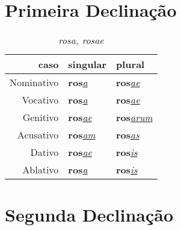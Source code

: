 \documentclass{article}
\newcommand{\radicaldesinencia}[2]{\textbf{#1}\textit{\underline{#2}}}
\begin{document}

\section*{Primeira Declinação}

\begin{table}[H]
\centering
\caption*{\textit{rosa, rosae}}
\vspace{0.2cm}
\begin{tabular}{r|l|l}
\hline
caso			&	singular					& plural 						\\
\hline                                    		
\hline
Nominativo	&	\radicaldesinencia{ros}{a}	& \radicaldesinencia{ros}{ae}	\\
Vocativo		&	\radicaldesinencia{ros}{a}	& \radicaldesinencia{ros}{ae}	\\
Genitivo		&	\radicaldesinencia{ros}{ae}	& \radicaldesinencia{ros}{arum}	\\
Acusativo	&	\radicaldesinencia{ros}{am}	& \radicaldesinencia{ros}{as}	\\
Dativo		&	\radicaldesinencia{ros}{ae}	& \radicaldesinencia{ros}{is}		\\
Ablativo		&	\radicaldesinencia{ros}{a}	& \radicaldesinencia{ros}{is}		\\


 \hline
\end{tabular}
\end{table}


\clearpage






\section*{Segunda Declinação}
\end{document}
